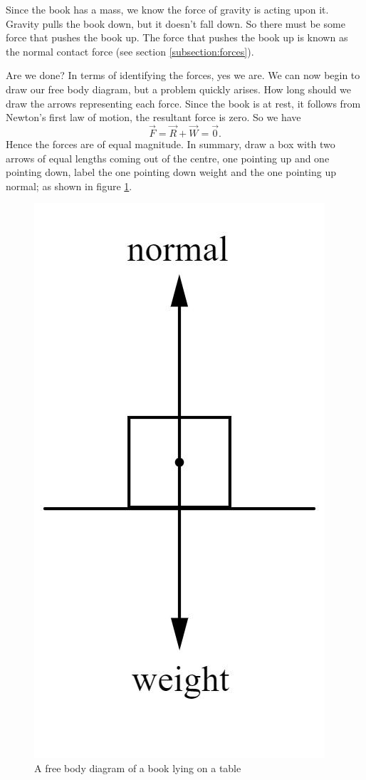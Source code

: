 Since the book has a mass, we know the force of gravity is acting upon it. Gravity pulls the book down, but it doesn't fall down. So there must be some force that pushes the book up. The force that pushes the book up is known as the normal contact force (see section \ref{subsection:forces}). 

Are we done? In terms of identifying the forces, yes we are. We can now begin to draw our free body diagram, but a problem quickly arises. How long should we draw the arrows representing each force. Since the book is at rest, it follows from Newton's first law of motion, the resultant force is zero. So we have
\begin{equation*}
    \vec{F} = \vec{R} + \vec{W} = \vec{0}.
\end{equation*}
Hence the forces are of equal magnitude. In summary, draw a box with two arrows of equal lengths coming out of the centre, one pointing up and one pointing down, label the one pointing down weight and the one pointing up normal; as shown in figure \ref{fig:free-body-diagram-book}. 

\begin{figure}[h!]
    \centering
    \includegraphics[scale=0.75]{notes/images/Free-Body-Diagram-Book.JPG}
    \caption{A free body diagram of a book lying on a table}
    \label{fig:free-body-diagram-book}
\end{figure}
\FloatBarrier

